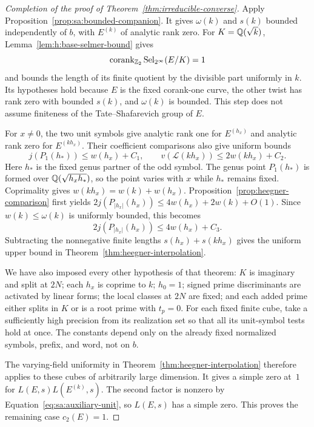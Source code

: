 \begin{proof}[Completion of the proof of
Theorem~\ref{thm:irreducible-converse}]
Apply Proposition~\ref{prop:sa:bounded-companion}. It gives
$\omega(k)$ and $s(k)$ bounded independently of $b$, with
$E^{(k)}$ of analytic rank zero. For $K=\mathbb Q(\sqrt{k})$,
Lemma~\ref{lem:h:base-selmer-bound} gives
\[
 \operatorname{corank}_{\mathbb Z_2}\operatorname{Sel}_{2^\infty}(E/K)=1
\]
and bounds the length of its finite quotient by the divisible part
uniformly in $k$.  Its hypotheses hold because $E$ is the fixed
corank-one curve, the other twist has rank zero with bounded $s(k)$,
and $\omega(k)$ is bounded.  This step does not assume finiteness
of the Tate--Shafarevich group of $E$.

For $x\ne0$, the two unit symbols give analytic rank one for
$E^{(h_x)}$ and analytic rank zero for $E^{(kh_x)}$.  Their
coefficient comparisons also give uniform bounds
\[
 j(P_1(h_*))\le w(h_x)+C_1,
 \qquad
 v(\mathcal L(kh_x))\le 2w(kh_x)+C_2.
\]
Here $h_*$ is the fixed genus partner of the odd symbol. The genus point
$P_1(h_*)$ is formed over $\mathbb Q(\sqrt{h_xh_*})$, so the point varies with
$x$ while $h_*$ remains fixed. Coprimality
gives $w(kh_x)=w(k)+w(h_x)$. Proposition~\ref{prop:heegner-comparison}
first yields $2j(P_{|h_x|}(h_x))\le4w(h_x)+2w(k)+O(1)$.
Since $w(k)\le\omega(k)$ is uniformly bounded, this becomes
\begin{equation}
 2j(P_{|h_x|}(h_x))\le 4w(h_x)+C_3.
 \label{eq:sa:heegner-upper}
\end{equation}
Subtracting the nonnegative finite lengths $s(h_x)+s(kh_x)$ gives
the uniform upper bound in Theorem~\ref{thm:heegner-interpolation}.

We have also imposed every other hypothesis of that theorem:
$K$ is imaginary and split at $2N$; each $h_x$ is coprime to $k$;
$h_0=1$; signed prime discriminants are activated by linear forms;
the local classes at $2N$ are fixed; and each added prime either
splits in $K$ or is a root prime with $t_p=0$.
For each fixed finite cube, take a sufficiently high precision from
its realization set so that all its unit-symbol tests hold at once.
The constants depend only on the already fixed normalized symbols,
prefix, and word, not on $b$.

The varying-field uniformity in
Theorem~\ref{thm:heegner-interpolation} therefore applies to these
cubes of arbitrarily large dimension.  It gives a simple zero at~$1$
for $L(E,s)L(E^{(k)},s)$.  The second factor is nonzero by
Equation~\eqref{eq:sa:auxiliary-unit}, so $L(E,s)$ has a simple
zero.  This proves the remaining case $c_2(E)=1$.
\end{proof}
